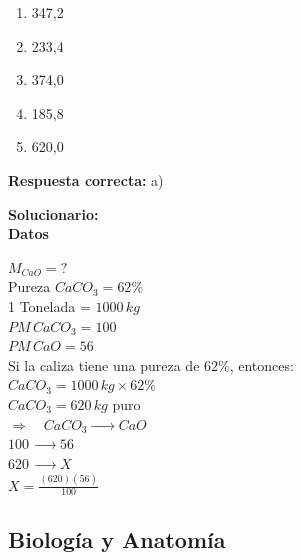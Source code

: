 \begin{enumerate}
	\begin{enumerate}[label=\alph*)]
		\item 347,2
		\item 233,4
		\item 374,0
		\item 185,8
		\item 620,0
	\end{enumerate}
	
	\textbf{Respuesta correcta:} a)
	
	\vspace{2mm}
	\textbf{Solucionario:}\\
	
	\textbf{Datos}
	
	$M_{CaO} = ?$\\
	Pureza $CaCO_3 = 62\%$\\
	1 Tonelada = $1000 \, kg$\\
	$ PM \, CaCO_3 = 100$\\
	$PM \, CaO = 56$\\
	Si la caliza tiene una pureza de $62\%$, entonces:\\
	$CaCO_3 = 1000 \, kg \times 62\%$\\
	$CaCO_3 = 620 \, kg$ puro\\
	
	$\Rightarrow \quad CaCO_3 \xrightarrow{\hspace{1cm}} CaO$\\
	\phantom{$\Rightarrow \quad$} $100 \xrightarrow{\hspace{1cm}} 56$\\
	\phantom{$\Rightarrow \quad$} $620 \xrightarrow{\hspace{1cm}} X$\\

	$X = \frac{(620)(56)}{100}$\\
	
	
	\vspace{6mm}
	
	
\end{enumerate}	
	
	
	\vspace{6mm}
	
	\subsection*{Biología y Anatomía}
	
